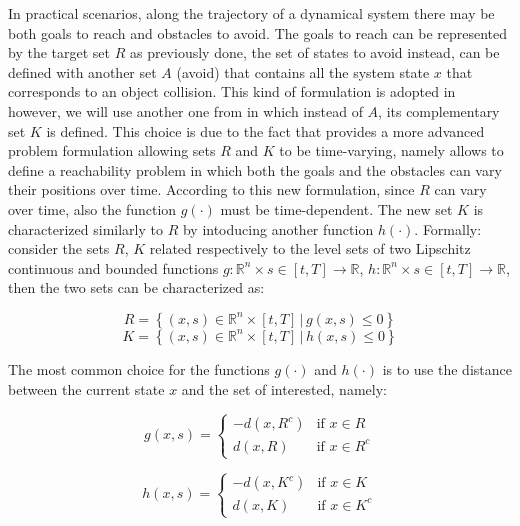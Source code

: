 In practical scenarios, along the trajectory of a dynamical system there may be both goals to reach and obstacles to avoid. The goals to reach can be represented by the target set $R$ as previously done, the set of states to avoid instead, can be defined with another set $A$ (avoid) that contains all the system state $x$ that corresponds to an object collision. This kind of formulation is adopted in \cite{reach_avoid_with_dist} however, we will use another one from \cite{new_paper} in which instead of $A$, its complementary set $K$ is defined. This choice is due to the fact that \cite{new_paper} provides a more advanced problem formulation allowing sets $R$ and $K$ to be time-varying, namely allows to define a reachability problem in which both the goals and the obstacles can vary their positions over time. According to this new formulation, since $R$ can vary over time, also the function $g(\cdot)$ must be time-dependent. The new set $K$ is characterized similarly to $R$ by intoducing another function $h(\cdot)$. Formally: consider the sets $R$, $K$ related respectively to the level sets of two Lipschitz continuous and bounded functions $g: \mathbb{R}^n \times s \in [t, T]\rightarrow \mathbb{R}$, $h: \mathbb{R}^n \times s \in [t, T] \rightarrow \mathbb{R}$, then the two sets can be characterized as:

\begin{equation} 
	\label{R}
	R = \left\{ (x,s) \in \mathbb{R}^n \times [t,T]\,|\, g(x, s) \leq 0 \right\}
\end{equation}
\begin{equation} 
	\label{K}
	K = \left\{(x,s) \in \mathbb{R}^n \times [t,T] \,|\, h(x, s) \leq 0 \right\}
\end{equation}


The most common choice for the functions $g(\cdot)$ and $h(\cdot)$ is to use the distance between the current state $x$ and the set of interested, namely:

\begin{equation}
\label{g}
    g(x, s) =
\left\{
	\begin{array}{ll}
		-d(x, R^c)  & \mbox{if } x \in R \\
		d(x, R) & \mbox{if } x \in R^c
	\end{array}
\right.
\end{equation}

\begin{equation}
\label{h}
    h(x, s) =
\left\{
	\begin{array}{ll}
		-d(x, K^c)  & \mbox{if } x \in K \\
		d(x, K) & \mbox{if } x \in K^c
	\end{array}
\right.
\end{equation}

